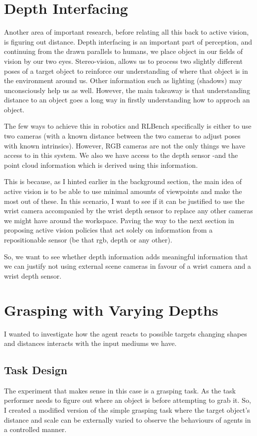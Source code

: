 \section{Depth Interfacing}
Another area of important research, before relating all this back to active vision, is figuring out distance. Depth interfacing is an important part of perception, and continuing from the drawn parallels to humans, we place object in our fields of vision by our two eyes. Stereo-vision, allows us to process two slightly different poses of a target object to reinforce our understanding of where that object is in the environment around us. Other information such as lighting (shadows) may unconsciously help us as well. However, the main takeaway is that understanding distance to an object goes a long way in firstly understanding how to approch an object.

The few ways to achieve this in robotics and RLBench specifically is either to use two cameras (with a known distance between the two cameras to adjust poses with known intrinsics). However, RGB cameras are not the only things we have access to in this system. We also we have access to the depth sensor -and the point cloud information which is derived using this information.

This is because, as I hinted earlier in the background section, the main idea of active vision is to be able to use minimal amounts of viewpoints and make the most out of these. In this scenario, I want to see if it can be justified to use the wrist camera accompanied by the wrist depth sensor to replace any other cameras we might have around the workspace. Paving the way to the next section in proposing active vision policies that act solely on information from a repositionable sensor (be that rgb, depth or any other).

So,  we want to see whether depth information adds meaningful information that we can justify not using external scene cameras in favour of a wrist camera and a wrist depth sensor.

\section{Grasping with Varying Depths}
I wanted to investigate how the agent reacts to possible targets changing shapes and distances interacts with the input mediums we have.

\subsection{Task Design}
The experiment that makes sense in this case is a grasping task. As the task performer needs to figure out where an object is before attempting to grab it. So, I created a modified version of the simple grasping task where the target object's distance and scale can be externally varied to observe the behaviours of agents in a controlled manner.

